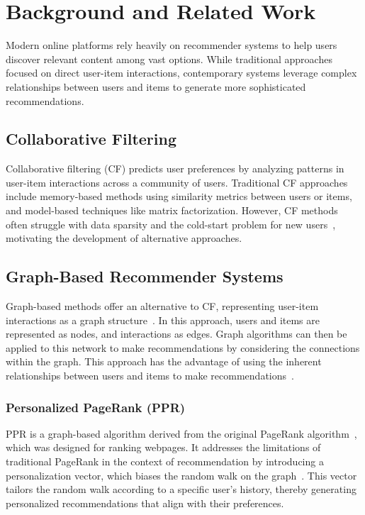 \documentclass[conference,compsoc]{IEEEtran}
\begin{document}
\section{Background and Related Work}
Modern online platforms rely heavily on recommender systems to help users discover relevant content among vast options. While traditional approaches focused on direct user-item interactions, contemporary systems leverage complex relationships between users and items to generate more sophisticated recommendations.

\subsection{Collaborative Filtering}
Collaborative filtering (CF) predicts user preferences by analyzing patterns in user-item interactions across a community of users. Traditional CF approaches include memory-based methods using similarity metrics between users or items, and model-based techniques like matrix factorization. However, CF methods often struggle with data sparsity and the cold-start problem for new users~\cite{1707.07435}, motivating the development of alternative approaches.

\subsection{Graph-Based Recommender Systems}
Graph-based methods offer an alternative to CF, representing user-item interactions as a graph structure~\cite{1812.08434}. In this approach, users and items are represented as nodes, and interactions as edges. Graph algorithms can then be applied to this network to make recommendations by considering the connections within the graph. This approach has the advantage of using the inherent relationships between users and items to make recommendations~\cite{1707.07435}.

\subsubsection{Personalized PageRank (PPR)}
PPR is a graph-based algorithm derived from the original PageRank algorithm~\cite{ilprints422}, which was designed for ranking webpages. It addresses the limitations of traditional PageRank in the context of recommendation by introducing a personalization vector, which biases the random walk on the graph~\cite{Haveliwala2002}. This vector tailors the random walk according to a specific user's history, thereby generating personalized recommendations that align with their preferences.
\end{document}
